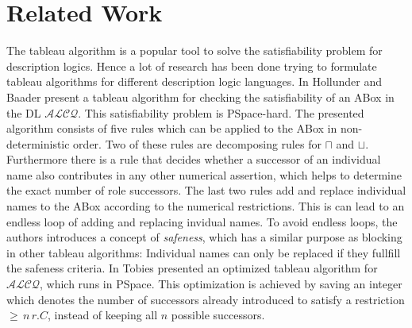 \documentclass{book}
\theoremstyle{break}
\theoremstyle{definition}
\begin{document}
\section{Related Work}
The tableau algorithm is a popular tool to solve the satisfiability problem for description logics. Hence a lot of research has been done trying to formulate tableau algorithms for different description logic languages. In \cite{1} Hollunder and Baader present a tableau algorithm for checking the satisfiability of an ABox in the DL $\mathcal{ALCQ}$. This satisfiability problem is PSpace-hard. The presented algorithm consists of five rules which can be applied to the ABox in non-deterministic order. Two of these rules are decomposing rules for $\sqcap$ and $\sqcup$. Furthermore there is a rule that decides whether a successor of an individual name also contributes in any other numerical assertion, which helps to determine the exact number of role successors. The last two rules add and replace individual names to the ABox according to the numerical restrictions. This is can lead to an endless loop of adding and replacing invidual names. To avoid endless loops, the authors introduces a concept of \textit{safeness}, which has a similar purpose as blocking in other tableau algorithms: Individual names can only be replaced if they fullfill the safeness criteria. In \cite{pspace} Tobies presented an optimized tableau algorithm for $\mathcal{ALCQ}$, which runs in PSpace. This optimization is achieved by saving an integer which denotes the number of successors already introduced to satisfy a restriction $\geq\,n\,r.C$, instead of keeping all $n$ possible successors.\\
\end{document}
